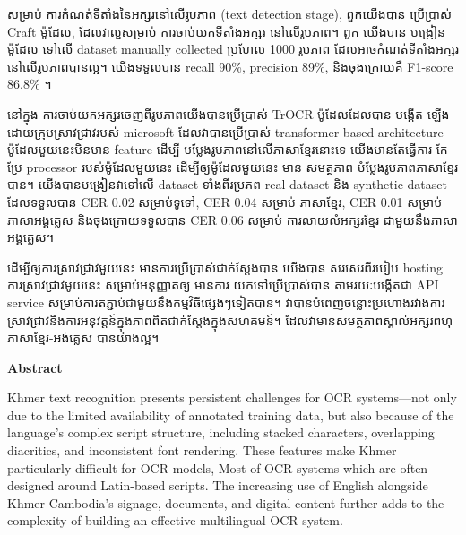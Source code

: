 \begin{adjustwidth}{0.2cm}{0.2cm}
    សម្រាប់ ការកំណត់ទីតាំងនៃអក្សរនៅលើរូបភាព (text detection stage), ពួកយើងបាន
    ប្រើប្រាស់ Craft ម៉ូដែល, ដែលវាល្អសម្រាប់ ការចាប់យកទីតាំងអក្សរ នៅលើរូបភាព។ ពួក
    យើងបាន បង្រៀនម៉ូដែល ទៅលើ dataset manually collected ប្រហែល 1000 
    រូបភាព ដែលអាចកំណត់ទីតាំងអក្សរនៅលើរូបភាពបានល្អ។ យើងទទួលបាន recall 90\%, 
    precision 89\%, និងចុងក្រោយគឺ F1-score 86.8\% ។ 

    នៅក្នុង ការចាប់យកអក្សរចេញពីរូបភាពយើងបានប្រើប្រាស់ TrOCR ម៉ូដែលដែលបាន បង្កើត
    ឡើងដោយក្រុមស្រាវជ្រាវរបស់ microsoft ដែលវាបានប្រើប្រាស់ transformer-based 
    architecture ម៉ូដែលមួយនេះមិនមាន feature ដើម្បី បម្លែងរូបភាពនៅលើភាសាខ្មែរនោះទេ 
    យើងមានតែធ្វើការ កែប្រែ processor របស់ម៉ូដែលមួយនេះ ដើម្បីឲ្យម៉ូដែលមួយនេះ មាន
    សមត្ថភាព បំប្លែងរូបភាពភាសាខ្មែរបាន។ យើងបានបង្រៀនវាទៅលើ dataset ទាំងពីរប្រភព 
    real dataset និង synthetic dataset ដែលទទួលបាន CER 0.02 សម្រាប់ទូទៅ, 
    CER 0.04 សម្រាប់ ភាសាខ្មែរ,  CER 0.01 សម្រាប់ភាសាអង្គគ្លេស និងចុងក្រោយទទួលបាន 
    CER 0.06 សម្រាប់ ការលាយលំអក្សរខ្មែរ ជាមួយនឹងភាសាអង្គគ្លេស។

    ដើម្បីឲ្យការស្រាវជ្រាវមួយនេះ មានការប្រើប្រាស់ជាក់ស្ដែងបាន យើងបាន សរសេរពីរបៀប 
    hosting ការស្រាវជ្រាវមូយនេះ សម្រាប់អនុញ្ញាតឲ្យ មានការ យកទៅប្រើប្រាស់បាន 
    តាមរយៈបង្កើតជា API service សម្រាប់ការតភ្ជាប់ជាមួយនឹងកម្មវិធីផ្សេងៗទៀតបាន។ 
    វាបានបំពេញចន្លោះប្រហោងរវាងការស្រាវជ្រាវនិងការអនុវត្តន៍ក្នុងភាពពិតជាក់ស្ដែងក្នុងសហគមន៍។
    ដែលវាមានសមត្ថភាពស្គាល់អក្សរពហុភាសាខ្មែរ-អង់គ្លេស បានយ៉ាងល្អ។   
    \vspace{2cm}
    
    \begin{center}
        {\bfseries\LARGE Abstract \par}
    \end{center}
    \label{abstract}
    \vspace{0.5cm}
    \englishfont
    \large
    
    Khmer text recognition presents persistent challenges for OCR 
    systems—not only due to the limited availability of annotated 
    training data, but also because of the language's complex script 
    structure, including stacked characters, overlapping diacritics, 
    and inconsistent font rendering. These features make Khmer 
    particularly difficult for OCR models, Most of OCR systems which 
    are often designed around Latin-based scripts. The increasing 
    use of English alongside Khmer Cambodia’s signage, documents, 
    and digital content further adds to the complexity of building 
    an effective multilingual OCR system.


\end{adjustwidth}
